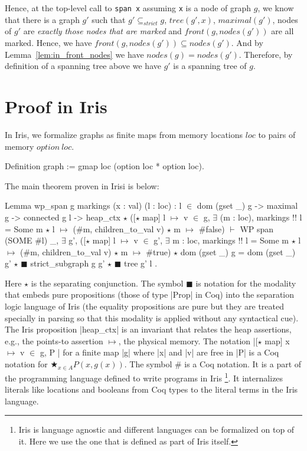 \documentclass[nocopyrightspace]{sigplanconf}
\def\MyMLe{\lstinline[language=MyML, basicstyle=\small\ttfamily]}
\newcommand{\nodes}{\mathit{nodes}}
\newcommand{\front}{\mathit{front}}
\newcommand{\maximal}{\mathit{maximal}}
\newcommand{\tree}{\mathit{tree}}
\newcommand{\strictSG}{\subseteq_{\mathit{strict}}}
\newcommand{\loc}{\mathit{loc}}
\newcommand{\option}{\mathit{option}}
\begin{document}
Hence, at the top-level call to \MyMLe{span x} assuming \MyMLe{x} is a node of graph $g$, we know that there is a graph $g'$ such that
$g' \strictSG g$, $\tree(g', x)$, $\maximal(g')$, nodes of $g'$ are \emph{exactly those nodes that are marked} and $\front(g, \nodes(g'))$ are all marked.
Hence, we have $\front(g, \nodes(g')) \subseteq \nodes(g')$.
And by Lemma~\ref{lem:in_front_nodes} we have $\nodes(g) = \nodes(g')$.
Therefore, by definition of a spanning tree above we have $g'$ is a spanning tree
of $g$.

\section{Proof in Iris}
In Iris, we formalize graphs as finite maps from memory locations $\mathit{loc}$ to pairs of memory $\option~\loc$.
\begin{Coq}
Definition graph := gmap loc (option loc * option loc).
\end{Coq}

The main theorem proven in Irisi is  below:
\begin{Coq}
Lemma wp_span g markings (x : val) (l : loc) :
    l $\in$ dom (gset _) g -> maximal g -> connected g l ->
    heap_ctx $\star$
    ([$\star$ map] l $\mapsto$ v $\in$ g,
       $\exists$ (m : loc), markings !! l = Some m $\star$
          l $\mapsto$ ($\#$m, children_to_val v) $\star$ m $\mapsto$ $\#$false) $\vdash$
    WP span (SOME $\#$l)
    {{ _, $\exists$ g',
            ([$\star$ map] l $\mapsto$ v $\in$ g',
              $\exists$ m : loc, markings !! l = Some m $\star$
                l $\mapsto$ ($\#$m, children_to_val v) $\star$ m $\mapsto$ $\#$true)
           $\star$ dom (gset _) g = dom (gset _) g'
           $\star$ $\scriptscriptstyle\blacksquare$ strict_subgraph g g' $\star$ $\scriptscriptstyle\blacksquare$ tree g' l }}.
\end{Coq}
Here $\star$ is the separating conjunction. The symbol $\scriptscriptstyle\blacksquare$ is notation for the modality that
embeds pure propositions (those of type \Coqe|Prop| in Coq) into
the separation logic language of Iris (the equality propositions are pure but they are treated specially in parsing so that this modality is applied without any syntactical cue).
The Iris proposition \Coqe|heap_ctx| is an invariant that relates the heap
assertions, e.g., the points-to assertion $\mapsto$, the physical memory.
The notation \Coqe|[$\star$ map] x $
\mapsto$ v $\in$ g, P | for a finite map \Coqe|g| where \Coqe|x| and \Coqe|v| are free in \Coqe|P| is a Coq notation for $
\bigstar_{x \in A} P(x, g(x))$.
The symbol $\#$ is a Coq notation. It is a part of the programming
language defined to write programs in Iris
\footnote{Iris is language agnostic and different languages can be formalized on top of it. Here we use the one that is defined as part of Iris itself.}.
It internalizes literals like locations and booleans from Coq types to the literal terms in the Iris language.
\end{document}
